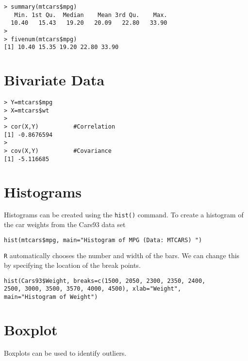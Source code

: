 \documentclass[a4paper,12pt]{article}
\begin{document}
\begin{itemize}
\footnotesize
\begin{myindentpar}{1cm}
\begin{verbatim}
> summary(mtcars$mpg)
   Min. 1st Qu.  Median    Mean 3rd Qu.    Max.
  10.40   15.43   19.20   20.09   22.80   33.90 
>
> fivenum(mtcars$mpg)
[1] 10.40 15.35 19.20 22.80 33.90
\end{verbatim}
\end{myindentpar}
\normalsize




\section{Bivariate Data}
\footnotesize \begin{myindentpar}{1cm}
\begin{verbatim}
> Y=mtcars$mpg
> X=mtcars$wt
>
> cor(X,Y)          #Correlation
[1] -0.8676594
>
> cov(X,Y)          #Covariance
[1] -5.116685
\end{verbatim}
\end{myindentpar}\normalsize


\section{Histograms}
Histograms can be created using the \texttt{hist()} command.
To create a histogram of the car weights from the Cars93 data set
\footnotesize
\begin{myindentpar}{1cm}
\begin{verbatim}
hist(mtcars$mpg, main="Histogram of MPG (Data: MTCARS) ")
\end{verbatim}
\end{myindentpar}\normalsize
\texttt{R} automatically chooses the number and width of the bars. We can
change this by specifying the location of the break points.
\footnotesize
\begin{myindentpar}{1cm}
\begin{verbatim}hist(Cars93$Weight, breaks=c(1500, 2050, 2300, 2350, 2400,
2500, 3000, 3500, 3570, 4000, 4500), xlab="Weight",
main="Histogram of Weight")
\end{verbatim}
\end{myindentpar}\normalsize



\section{Boxplot}
Boxplots can be used to identify outliers.


\end{itemize}
\end{document}
